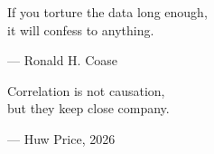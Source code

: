 \begin{flushright}
\begin{hangleftquote}{\QENOpen}{\QENClose}
If you torture the data long enough,\\
it will confess to anything.
\end{hangleftquote}
\par\smallskip
\normalfont — Ronald H. Coase
\end{flushright}

\vspace{2em}

\begin{flushright}
\begin{hangleftquote}{\QENOpen}{\QENClose}
Correlation is not causation,\\
but they keep close company.
\end{hangleftquote}
\par\smallskip
\normalfont — Huw Price, 2026
\end{flushright}
